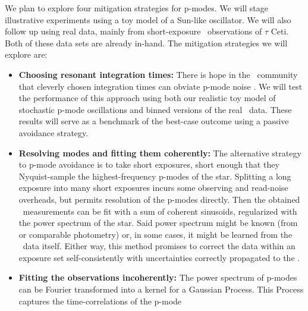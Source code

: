 \documentclass[12pt, letterpaper]{article}
\begin{document}
We plan to explore four mitigation strategies for p-modes. We will stage 
illustrative experiments using a toy model of a Sun-like oscillator. 
We will also follow up using real data, mainly from short-exposure 
\EXPRES\ observations of $\tau$ Ceti. Both of these data sets are already
in-hand. The mitigation strategies we will explore are:
\begin{itemize}
\item
\textbf{Choosing resonant integration times:}
There is hope in the \EPRV\ community that cleverly chosen integration
times can obviate p-mode noise \citep[see, \eg][]{Chaplin2019}.
We will test the performance of this approach using
both our realistic toy model of stochastic p-mode oscillations
and binned versions of the real \EXPRES\ data. 
These results will serve as a benchmark of the best-case outcome 
using a passive avoidance strategy.
\item
\textbf{Resolving modes and fitting them coherently:}
The alternative strategy to p-mode avoidance is to take short exposures,
short enough that they Nyquist-sample the highest-frequency p-modes of
the star.
Splitting a long exposure into many short exposures 
incurs some observing and read-noise overheads, but permits
resolution of the p-modes directly.
Then the obtained \RV\ measurements can be fit with a sum of coherent
sinusoids, regularized with the power spectrum of the
star. 
Said power spectrum might be known (from \TESS or comparable photometry) or,
in some cases, it might be learned from the \RV\ data itself. 
Either way, this method promises to correct the data within an exposure set 
self-consistently with uncertainties correctly propagated to the \RV.
\item
\textbf{Fitting the observations incoherently:}
The power spectrum of p-modes can be Fourier transformed into a kernel
for a Gaussian Process.
This Process captures the time-correlations of the p-mode

\end{itemize}
\end{document}
